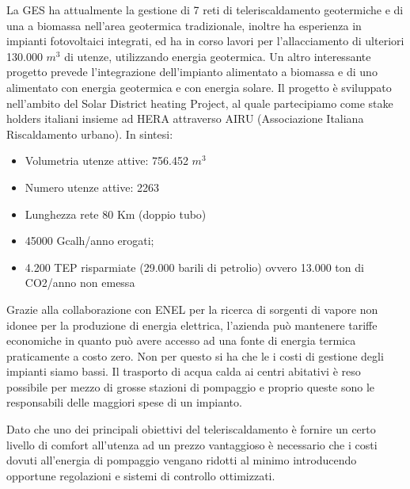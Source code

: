 \documentclass[laurea,oneside,11pt]{USiena_tesiLM}
\begin{document}
La GES ha attualmente la gestione di 7 reti di teleriscaldamento geotermiche e di una a biomassa nell'area geotermica tradizionale, inoltre ha esperienza in impianti fotovoltaici integrati, ed ha in corso lavori per l'allacciamento di ulteriori 130.000 $m^3$ di utenze, utilizzando energia geotermica. Un altro interessante progetto prevede l'integrazione dell'impianto alimentato a biomassa e di uno alimentato con energia geotermica e con energia solare. Il progetto è sviluppato nell'ambito del Solar District heating Project, al quale partecipiamo come stake holders italiani insieme ad HERA attraverso AIRU (Associazione Italiana Riscaldamento urbano).
In sintesi:
\begin{itemize}
\item Volumetria utenze attive: 756.452 $m^3$
\item Numero utenze attive: 2263
\item Lunghezza rete 80 Km (doppio tubo)
\item 45000 Gcalh/anno erogati; 
\item 4.200 TEP risparmiate (29.000 barili di petrolio) ovvero 13.000 ton di CO2/anno non emessa
\end{itemize}


Grazie alla collaborazione con ENEL per la ricerca di sorgenti di vapore non idonee per la produzione di energia elettrica, l'azienda può  mantenere tariffe economiche in quanto può avere accesso ad una fonte di energia termica praticamente a costo zero. Non per questo si ha che le i costi di gestione degli impianti siamo bassi. Il trasporto di acqua calda ai centri abitativi è reso possibile per mezzo di grosse stazioni di pompaggio e proprio queste sono le responsabili delle maggiori spese di un impianto. 

Dato che uno dei principali obiettivi del teleriscaldamento è fornire un certo livello di comfort all'utenza ad un prezzo vantaggioso è necessario che i costi dovuti all'energia di pompaggio vengano ridotti al minimo introducendo opportune regolazioni e sistemi di controllo ottimizzati. 
\end{document}
